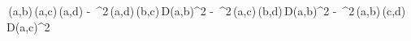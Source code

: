 \lambda\,\delta(a,b)\,\delta(a,c)\,\delta(a,d) - \,\lambda^{2}\,\delta(a,d)\,\delta(b,c)\,D(a,b)^{2} - \,\lambda^{2}\,\delta(a,c)\,\delta(b,d)\,D(a,b)^{2} - \,\lambda^{2}\,\delta(a,b)\,\delta(c,d)\,D(a,c)^{2}